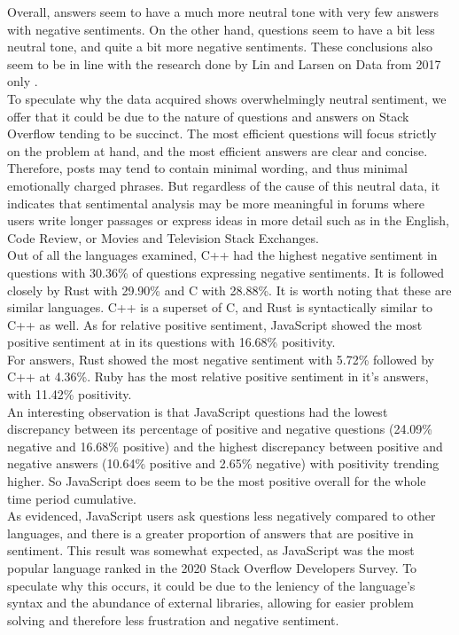 \documentclass[conference]{IEEEtran}
\begin{document}
Overall, answers seem to have a much more neutral tone with very few answers with negative sentiments. On the other hand, questions seem to have a bit less neutral tone, and quite a bit more negative sentiments. These conclusions also seem to be in line with the research done by Lin and Larsen on Data from 2017 only \cite{b11}.\\

To speculate why the data acquired shows overwhelmingly neutral sentiment, we offer that it could be due to the nature of questions and answers on Stack Overflow tending to be succinct. The most efficient questions will focus strictly on the problem at hand, and the most efficient answers are clear and concise. Therefore, posts may tend to contain minimal wording, and thus minimal emotionally charged phrases. But regardless of the cause of this neutral data, it indicates that sentimental analysis may be more meaningful in forums where users write longer passages or express ideas in more detail such as in the English, Code Review, or Movies and Television Stack Exchanges.\\

Out of all the languages examined, C++ had the highest negative sentiment in questions with 30.36\% of questions expressing negative sentiments. It is followed closely by Rust with 29.90\% and C with 28.88\%. It is worth noting that these are similar languages. C++ is a superset of C, and Rust is syntactically similar to C++ as well\cite{b37}. As for relative positive sentiment, JavaScript showed the most positive sentiment at in its questions with 16.68\% positivity.\\

For answers, Rust showed the most negative sentiment with 5.72\% followed by C++ at 4.36\%. Ruby has the most relative positive sentiment in it's answers, with 11.42\% positivity.\\

An interesting observation is that JavaScript questions had the lowest discrepancy between its percentage of positive and negative questions (24.09\% negative and 16.68\% positive) and the highest discrepancy between positive and negative answers (10.64\% positive and 2.65\% negative) with positivity trending higher. So JavaScript does seem to be the most positive overall for the whole time period cumulative.\\

As evidenced, JavaScript users ask questions less negatively compared to other languages, and there is a greater proportion of answers that are positive in sentiment. This result was somewhat expected, as JavaScript was the most popular language ranked in the 2020 Stack Overflow Developers Survey\cite{b29}. To speculate why this occurs, it could be due to the leniency of the language's syntax and the abundance of external libraries, allowing for easier problem solving and therefore less frustration and negative sentiment. \\
\end{document}
